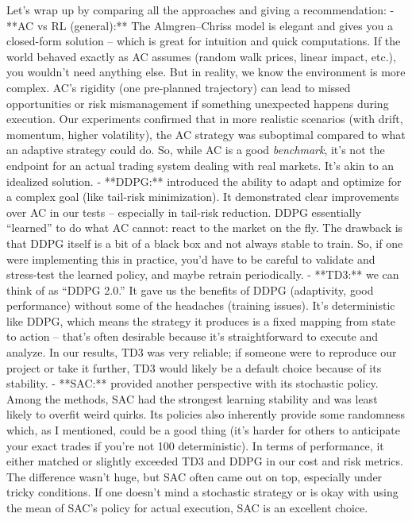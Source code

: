 \documentclass[11pt]{article}
\begin{document}
		Let’s wrap up by comparing all the approaches and giving a recommendation:
		- **AC vs RL (general):** The Almgren–Chriss model is elegant and gives you a closed-form solution – which is great for intuition and quick computations. If the world behaved exactly as AC assumes (random walk prices, linear impact, etc.), you wouldn’t need anything else. But in reality, we know the environment is more complex. AC’s rigidity (one pre-planned trajectory) can lead to missed opportunities or risk mismanagement if something unexpected happens during execution. Our experiments confirmed that in more realistic scenarios (with drift, momentum, higher volatility), the AC strategy was suboptimal compared to what an adaptive strategy could do. So, while AC is a good \textit{benchmark}, it’s not the endpoint for an actual trading system dealing with real markets. It’s akin to an idealized solution.
		- **DDPG:** introduced the ability to adapt and optimize for a complex goal (like tail-risk minimization). It demonstrated clear improvements over AC in our tests – especially in tail-risk reduction. DDPG essentially “learned” to do what AC cannot: react to the market on the fly. The drawback is that DDPG itself is a bit of a black box and not always stable to train. So, if one were implementing this in practice, you’d have to be careful to validate and stress-test the learned policy, and maybe retrain periodically.
		- **TD3:** we can think of as “DDPG 2.0.” It gave us the benefits of DDPG (adaptivity, good performance) without some of the headaches (training issues). It’s deterministic like DDPG, which means the strategy it produces is a fixed mapping from state to action – that’s often desirable because it’s straightforward to execute and analyze. In our results, TD3 was very reliable; if someone were to reproduce our project or take it further, TD3 would likely be a default choice because of its stability.
		- **SAC:** provided another perspective with its stochastic policy. Among the methods, SAC had the strongest learning stability and was least likely to overfit weird quirks. Its policies also inherently provide some randomness which, as I mentioned, could be a good thing (it’s harder for others to anticipate your exact trades if you’re not 100 deterministic). In terms of performance, it either matched or slightly exceeded TD3 and DDPG in our cost and risk metrics. The difference wasn’t huge, but SAC often came out on top, especially under tricky conditions. If one doesn’t mind a stochastic strategy or is okay with using the mean of SAC’s policy for actual execution, SAC is an excellent choice.
\end{document}
